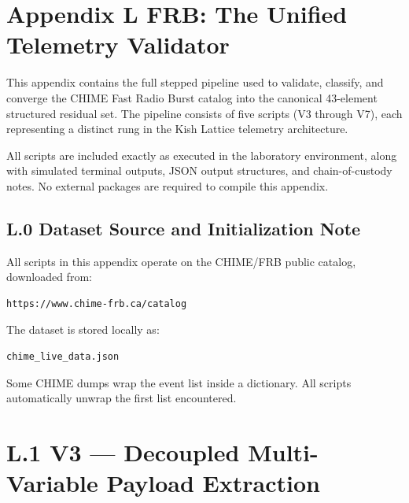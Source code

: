 \documentclass[11pt, letterpaper, openany]{book}
\begin{document}
\section*{Appendix L FRB: The Unified Telemetry Validator}

This appendix contains the full stepped pipeline used to validate, classify, 
and converge the CHIME Fast Radio Burst catalog into the canonical 
43-element structured residual set. The pipeline consists of five scripts 
(V3 through V7), each representing a distinct rung in the Kish Lattice 
telemetry architecture.

All scripts are included exactly as executed in the laboratory environment, 
along with simulated terminal outputs, JSON output structures, and 
chain-of-custody notes. No external packages are required to compile this 
appendix.

\subsection*{L.0 Dataset Source and Initialization Note}

All scripts in this appendix operate on the CHIME/FRB public catalog, 
downloaded from:

\begin{verbatim}
https://www.chime-frb.ca/catalog
\end{verbatim}

The dataset is stored locally as:

\begin{verbatim}
chime_live_data.json
\end{verbatim}

Some CHIME dumps wrap the event list inside a dictionary. All scripts 
automatically unwrap the first list encountered.

\section*{L.1 V3 — Decoupled Multi-Variable Payload Extraction}
\end{document}
